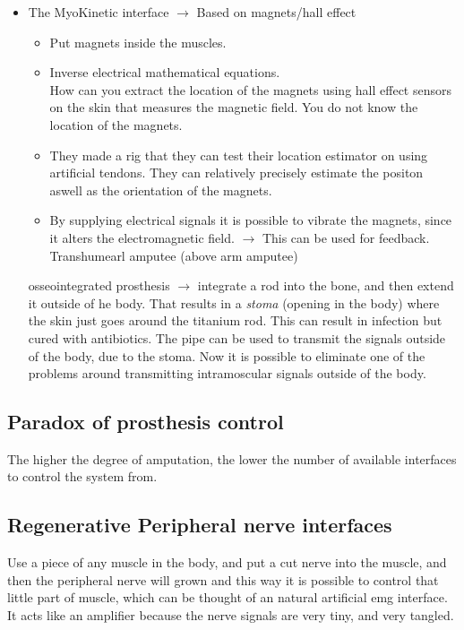 \documentclass[a4paper]{article}
\begin{document}
\begin{itemize}
\begin{itemize}
	\end{itemize}
\item The MyoKinetic interface $ \rightarrow $ Based on magnets/hall effect
	\begin{itemize}
		\item Put magnets inside the muscles. 
		\item Inverse electrical mathematical equations. \\
			How can you extract the location of the magnets using hall effect sensors on the skin that measures the magnetic field. You do not know the location of the magnets. 
		\item They made a rig that they can test their location estimator on using artificial tendons. They can relatively precisely estimate the positon aswell as the orientation of the magnets.   
		\item By supplying electrical signals it is possible to vibrate the magnets, since it alters the electromagnetic field.  $ \rightarrow $ This can be used for feedback. 
Transhumearl amputee (above arm amputee)
	\end{itemize}
	osseointegrated prosthesis $ \rightarrow $ integrate a rod into the bone, and then extend it outside of he body. That results in a \textit{stoma} (opening in the body) where the skin just goes around the titanium rod. This can result in infection but cured with antibiotics. The pipe can be used to transmit the signals outside of the body, due to the stoma. Now it is possible to eliminate one of the problems around transmitting intramoscular signals outside of the body. 
\end{itemize}

\subsection{Paradox of prosthesis control}
The higher the degree of amputation, the lower the number of available interfaces to control the system from.

\subsection{Regenerative Peripheral nerve interfaces}
Use a piece of any muscle in the body, and put a cut nerve into the muscle, and then the peripheral nerve will grown and this way it is possible to control that little part of muscle, which can be thought of an natural artificial emg interface. It acts like an amplifier because the nerve signals are very tiny, and very tangled. 
\end{document}
